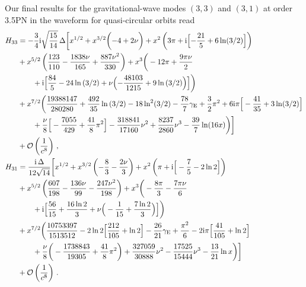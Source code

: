 \documentclass[prd,preprint,superscriptaddress,tightenlines,nofootinbib,
  eqsecnum,showpacs]{revtex4}
\newcommand{\ui}{\mathrm{i}}
\begin{document}
Our final results for the gravitational-wave modes $(3,3)$ and $(3,1)$
at order 3.5PN in the waveform for quasi-circular orbits read
%
\begin{subequations} \label{hlm}\begin{align}
H_{33} &=-\frac{3}{4} \ui \sqrt{\frac{15}{14}} \,\Delta
\bigg[x^{1/2}+x^{3/2} \biggl(-4+2 \nu \biggr)+x^2 \left(3 \pi +\ui
  \Bigl[-\frac{21}{5}+6 \ln (3/2)\Bigr]\right) \nonumber \\ &+x^{5/2}
  \left(\frac{123}{110}-\frac{1838 \nu }{165}+\frac{887 \nu
    ^2}{330}\right)+x^3 \bigg(-12 \pi +\frac{9 \pi \nu }{2} \nonumber
  \\ & \qquad +\ui \Bigl[\frac{84}{5}-24 \ln \left(3/2\right)+\nu
    \Bigl(-\frac{48103}{1215}+9 \ln \left(3/2\right)\Bigr)\Bigr]\bigg)
  \nonumber \\ & + x^{7/2}\biggl(\frac{19388147}{280280} +
  \frac{492}{35} \ln \left(3/2\right) -18\ln^2 (3/2) -
  \frac{78}{7}\gamma_\text{E} + \frac{3}{2} \pi^2 + 6 \ui \pi
  \Big[-\frac{41}{35} + 3 \ln (3/2) \Big] \nonumber \\ & \qquad +
  \frac{\nu}{8} \Big[- \frac{7055}{429} + \frac{41}{8} \pi^2 \Big] -
  \frac{318841}{17160} \nu^2 + \frac{8237}{2860} \nu^3 - \frac{39}{7}
  \ln (16x) \biggr)\bigg] \nonumber \\ &+
\mathcal{O}\left(\frac{1}{c^8}\right)\,,\\
H_{31} &=\frac{\ui \,\Delta}{12 \sqrt{14}} \bigg[x^{1/2}+x^{3/2}
  \left(-\frac{8}{3}-\frac{2 \nu }{3}\right)+x^2 \left(\pi +\ui
  \Big[-\frac{7}{5}-2 \ln 2\Big]\right) \nonumber \\ &+x^{5/2}
  \left(\frac{607}{198}-\frac{136 \nu }{99}-\frac{247
    \nu^2}{198}\right)+x^3 \bigg(-\frac{8 \pi }{3}-\frac{7 \pi \nu
  }{6} \nonumber \\ & \qquad +\ui \Big[\frac{56}{15}+\frac{16 \ln
      2}{3}+\nu \Big(-\frac{1}{15}+\frac{7 \ln 2}{3}\Big)\Big]\bigg)
  \nonumber \\ &+ x^{7/2}\biggl( \frac{10753397}{1513512} - 2 \ln 2
  \Big[ \frac{212}{105} + \ln 2\Big] - \frac{26}{21} \gamma_\text{E} +
  \frac{\pi^2}{6} -2 \ui \pi \Big[ \frac{41}{105} + \ln 2 \Big]
  \nonumber \\ & \qquad + \frac{\nu}{8} \bigg(- \frac{1738843}{19305}
  + \frac{41}{8} \pi^2 \bigg) + \frac{327059}{30888} \nu^2 -
  \frac{17525}{15444} \nu^3 - \frac{13}{21} \ln x \biggr)\bigg]
\nonumber \\ & + \mathcal{O}\left(\frac{1}{c^8}\right)\,.
\end{align}\end{subequations}
\end{document}
